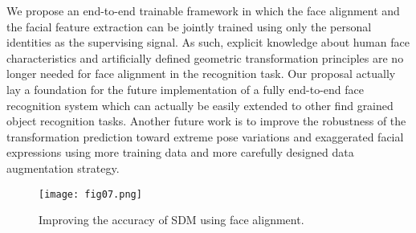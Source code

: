 \documentclass[10pt,twocolumn,letterpaper]{article}
\begin{document}
We propose an end-to-end trainable framework in which the face alignment and the facial feature extraction can be jointly trained using only the personal identities as the supervising signal.
As such, explicit knowledge about human face characteristics and artificially defined geometric transformation principles are no longer needed for face alignment in the recognition task.
Our proposal actually lay a foundation for the future implementation of a fully end-to-end face recognition system which can actually be easily extended to other find grained object recognition tasks.
Another future work is to improve the robustness of the transformation prediction toward extreme pose variations and exaggerated facial expressions using more training data and more carefully designed data augmentation strategy.

\begin{figure}[t]
\begin{center}
\texttt{[image: fig07.png]}
\end{center}
   \caption{Improving the accuracy of SDM using face alignment.}
\label{fig07}
\end{figure}

{\small


}
\end{document}
